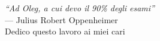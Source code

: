 \begin{dedication}
    \begin{flushright}
        \small
        \textit{``Ad Oleg, a cui devo il 90\% degli esami''} \\
        --- Julius Robert Oppenheimer \\[2em]
        \footnotesize Dedico questo lavoro ai miei cari
    \end{flushright}
\end{dedication}